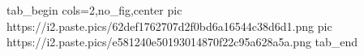  
 
 
 
 

\ifcmt
  tab_begin cols=2,no_fig,center
		 pic https://i2.paste.pics/62def1762707d2f0bd6a16544c38d6d1.png
		 pic https://i2.paste.pics/e581240e50193014870f22c95a628a5a.png
  tab_end
\fi
